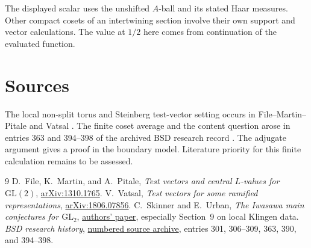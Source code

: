 \documentclass[11pt]{article}
\begin{document}
The displayed scalar uses the unshifted $A$-ball and its stated Haar
measures. Other compact cosets of an intertwining section involve their own
support and vector calculations. The value at $1/2$ here comes from
continuation of the evaluated function.

\section*{Sources}
The local non-split torus and Steinberg test-vector setting
occurs in File--Martin--Pitale \cite{FMP} and Vatsal \cite{Vatsal}.
The finite coset average and the content question arose in
entries 363 and 394--398 of the archived BSD research record
\cite{archive}. The adjugate argument gives a proof in the
boundary model. Literature priority for this finite calculation
remains to be assessed.

\begin{thebibliography}{9}
 D.~File, K.~Martin, and A.~Pitale,
\emph{Test vectors and central $L$-values for $\mathrm{GL}(2)$},
\href{https://arxiv.org/abs/1310.1765}{arXiv:1310.1765}.
 V.~Vatsal,
\emph{Test vectors for some ramified representations},
\href{https://arxiv.org/abs/1806.07856}{arXiv:1806.07856}.
 C.~Skinner and E.~Urban,
\emph{The Iwasawa main conjectures for $\mathrm{GL}_2$},
\href{https://www.math.columbia.edu/~urban/eurp/MC.pdf}{authors' paper},
especially Section~9 on local Klingen data.
 \emph{BSD research history},
\href{https://github.com/cosmosgeek0/BSD/blob/64194dff2dd10ea2fcfa9bd78bc123876d98e1f4/bsd-research-history.zip}{numbered source archive}, entries 301, 306--309, 363, 390, and 394--398.
\end{thebibliography}
\end{document}
